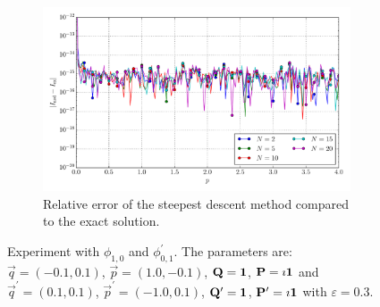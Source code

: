 \documentclass[a4paper,10pt]{article}
\begin{document}
\begin{figure}[ht!]
\begin{subfigure}[t]{0.5\linewidth}
    \includegraphics[width=\linewidth]{./plots/tp_2d_conv_p_(1,0)_(0,1)_err_rel_nsd.pdf}
    \caption{Relative error of the steepest descent method compared to the exact solution.}
    \label{fig:tp_2d_conv_p_10_01_err_nsd}
  \end{subfigure}
  \label{fig:tp_2d_conv_p_10_01}
  \caption{Experiment with $\phi_{1,0}$ and $\phi_{0,1}^{\prime}$.
  The parameters are:
  $\vec{q} = (-0.1,  0.1)$,
  $\vec{p} = ( 1.0, -0.1)$,
  $\mathbf{Q} = \mathbf{1}$,
  $\mathbf{P} = \imath \mathbf{1}$
  and
  $\vec{q}^\prime = ( 0.1, 0.1)$,
  $\vec{p}^\prime = (-1.0, 0.1)$,
  $\mathbf{Q}^\prime = \mathbf{1}$,
  $\mathbf{P}^\prime = \imath \mathbf{1}$
  with $\varepsilon=0.3$.}
\end{figure}
\end{document}
